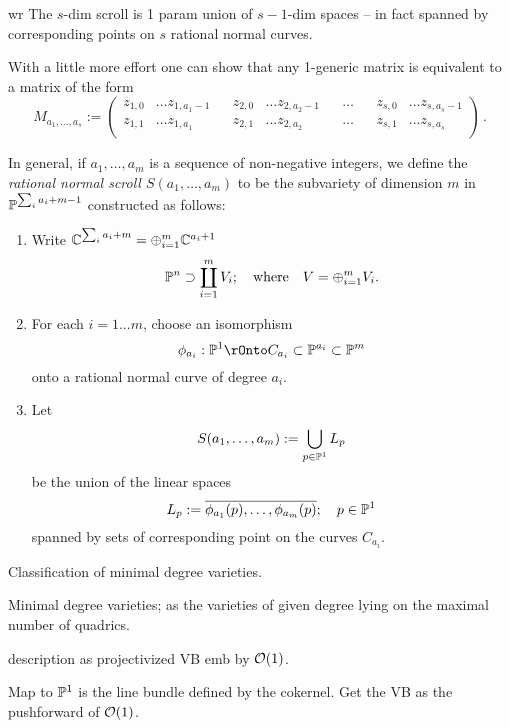 wr
The $s$-dim scroll is 1 param union of 
$s-1$-dim spaces -- in fact spanned by
corresponding points on $s$ rational normal curves.
\begin{fact}
 With a little more effort one can show that any
 1-generic matrix is equivalent to a matrix of the 
 form
 $$
 M_{a_{1}, \dots, a_{s}} := 
\begin{pmatrix}
 z_{1,0}& \dots z_{1,a_{1}-1}&&
 z_{2,0}& \dots z_{2,a_{2}-1}&&\dots&&
 z_{s,0}& \dots z_{s,a_{s}-1}\\
  z_{1,1}& \dots z_{1,a_{1}}&&
 z_{2,1}& \dots z_{2,a_{2}}&&\dots&&
 z_{s,1}& \dots z_{s,a_{s}}\\
\end{pmatrix}\,.
$$
\end{fact}

In general, if $a_1,\dots, a_m$ is a sequence of non-negative integers, we define the  \emph{rational normal scroll $S(a_1,\dots, a_m)$} 
to be the subvariety of dimension $m$ in $\PP^{\sum_i a_i+m-1}$ constructed as follows:

\begin{enumerate}
 \item Write $\CC^{\sum_i a_i+m} = \oplus_{i=1}^m\CC^{a_i+1}$ 
$$
\PP^n \supset \coprod_{i= 1}^m V_i; \quad \hbox{where} \quad V = \oplus_{i= 1}^m V_i.
$$
\item For each $i = 1...m$, choose an isomorphism 
$$
\phi_{a_i}:\PP^1\rOnto C_{a_i}\subset \PP^{a_i}\subset \PP^m
$$ 
onto a rational normal curve of degree $a_i$.
\item Let 
$$
S(a_1,\dots,a_m) := \bigcup_{p\in \PP^1} L_p
$$
 be the union of the linear spaces 
$$
L_p := \overline{\phi_{a_1}(p), \dots, \phi_{a_m}(p)}; \quad p\in \PP^1
$$
spanned by sets of corresponding point on the curves $C_{a_i}$.
\end{enumerate}


\begin{fact} 
 Classification of minimal degree varieties.
 
 Minimal degree varieties; as the varieties of given degree lying on the maximal number of quadrics.

\end{fact}
 
description as projectivized VB emb by $\cO(1)$.

  Map to $\PP^1$ is the line bundle defined by the cokernel. Get the VB as the pushforward of $\cO(1)$.
  
